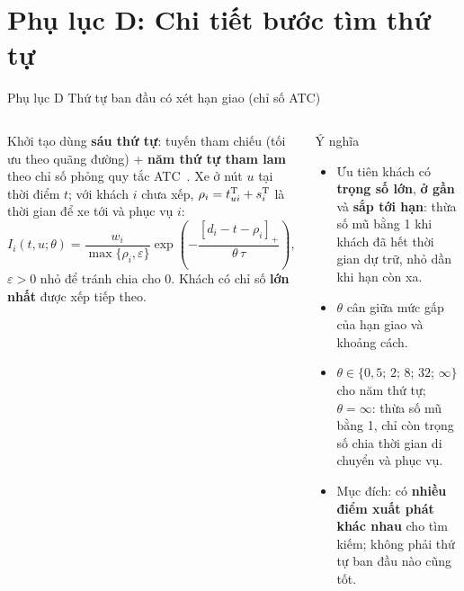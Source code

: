 \documentclass[aspectratio=169,10pt,t,xcolor={table}]{beamer}
\newcommand{\pos}[1]{\left[#1\right]_{+}}
\newcommand{\tT}{t^{\mathrm{T}}}
\newcommand{\apptitle}[2]{Phụ lục #1 \textperiodcentered{} #2}
\begin{document}
\section{Phụ lục D: Chi tiết bước tìm thứ tự}

\begin{frame}[label=appD]{\apptitle{D}{Thứ tự ban đầu có xét hạn giao (chỉ số ATC)}}
\begin{columns}[T,onlytextwidth]
\footnotesize
Khởi tạo dùng \textbf{sáu thứ tự}: tuyến tham chiếu (tối ưu theo quãng đường) + \textbf{năm thứ tự tham lam} theo chỉ số phỏng quy tắc ATC~\cite{atc1987}. Xe ở nút $u$ tại thời điểm $t$; với khách $i$ chưa xếp, $\rho_i=\tT_{ui}+s^{\rm T}_i$ là thời gian để xe tới và phục vụ $i$:
\[
I_i(t,u;\theta)=\frac{w_i}{\max\{\rho_i,\varepsilon\}}
\exp\!\left(-\frac{\pos{d_i-t-\rho_i}}{\theta\,\tau}\right),
\]
$\varepsilon>0$ nhỏ để tránh chia cho 0. Khách có chỉ số \textbf{lớn nhất} được xếp tiếp theo.
\begin{block}{Ý nghĩa}
\scriptsize
\begin{itemize}
\item Ưu tiên khách có \textbf{trọng số lớn}, \textbf{ở gần} và \textbf{sắp tới hạn}: thừa số mũ bằng 1 khi khách đã hết thời gian dự trữ, nhỏ dần khi hạn còn xa.
\item $\theta$ cân giữa mức gấp của hạn giao và khoảng cách.
\item $\theta\in\{0{,}5;\,2;\,8;\,32;\,\infty\}$ cho năm thứ tự; $\theta=\infty$: thừa số mũ bằng 1, chỉ còn trọng số chia thời gian di chuyển và phục vụ.
\item Mục đích: có \textbf{nhiều điểm xuất phát khác nhau} cho tìm kiếm; không phải thứ tự ban đầu nào cũng tốt.
\end{itemize}
\end{block}
\end{columns}
\end{frame}
\end{document}
